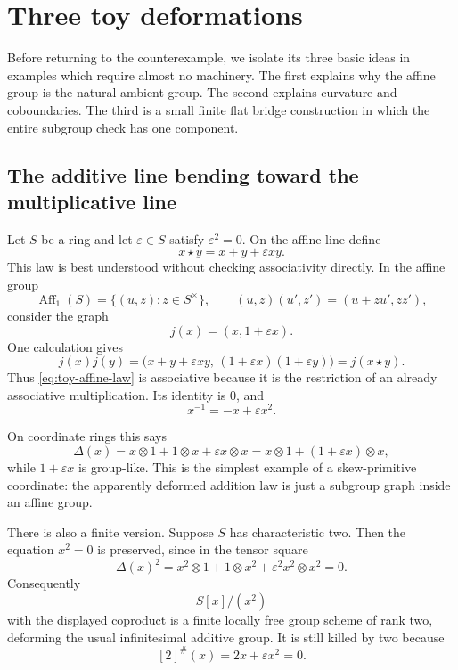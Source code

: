 \documentclass[11pt]{amsart}
\theoremstyle{definition}
\theoremstyle{remark}
\newcommand{\ot}{\otimes}
\begin{document}
\section{Three toy deformations}
\label{sec:toys}

Before returning to the counterexample, we isolate its three basic ideas
in examples which require almost no machinery.  The first explains why
the affine group is the natural ambient group.  The second explains
curvature and coboundaries.  The third is a small finite flat bridge
construction in which the entire subgroup check has one component.

\subsection{The additive line bending toward the multiplicative line}

Let \(S\) be a ring and let \(\varepsilon\in S\) satisfy
\(\varepsilon^2=0\).  On the affine line define
\begin{equation}\label{eq:toy-affine-law}
 x\star y=x+y+\varepsilon xy.
\end{equation}
This law is best understood without checking associativity directly.
In the affine group
\[
 \operatorname{Aff}_1(S)
 =\{(u,z):z\in S^\times\},
 \qquad
 (u,z)(u',z')=(u+zu',zz'),
\]
consider the graph
\begin{equation}\label{eq:toy-affine-graph}
 j(x)=(x,1+\varepsilon x).
\end{equation}
One calculation gives
\[
 j(x)j(y)
 =
 \bigl(x+y+\varepsilon xy,\,
       (1+\varepsilon x)(1+\varepsilon y)\bigr)
 =
 j(x\star y).
\]
Thus \eqref{eq:toy-affine-law} is associative because it is the
restriction of an already associative multiplication.  Its identity is
\(0\), and
\[
 x^{-1}=-x+\varepsilon x^2.
\]

On coordinate rings this says
\[
 \Delta(x)
 =x\ot1+1\ot x+\varepsilon x\ot x
 =x\ot1+(1+\varepsilon x)\ot x,
\]
while \(1+\varepsilon x\) is group-like.  This is the simplest example
of a skew-primitive coordinate: the apparently deformed addition law is
just a subgroup graph inside an affine group.

There is also a finite version.  Suppose \(S\) has characteristic two.
Then the equation \(x^2=0\) is preserved, since in the tensor square
\[
 \Delta(x)^2
 =x^2\ot1+1\ot x^2+\varepsilon^2x^2\ot x^2=0.
\]
Consequently
\[
 S[x]/(x^2)
\]
with the displayed coproduct is a finite locally free group scheme of
rank two, deforming the usual infinitesimal additive group.  It is still
killed by two because
\[
 [2]^\#(x)=2x+\varepsilon x^2=0.
\]
\end{document}
